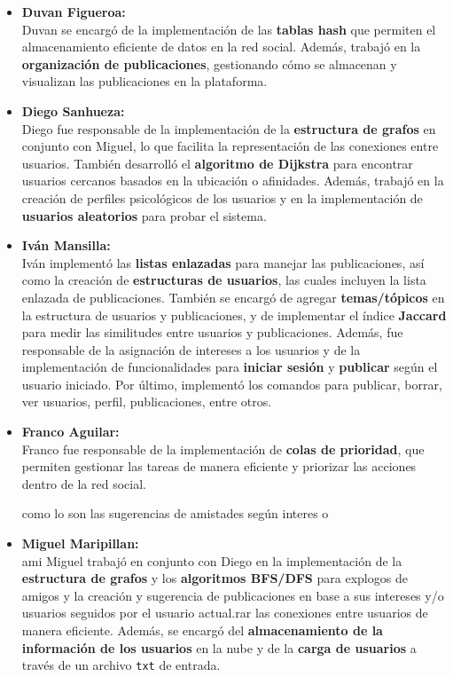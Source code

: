 \documentclass[9pt,letterpaper,onecolumn]{rho-class/rho}
\begin{document}
\begin{itemize}
	\item \textbf{Duvan Figueroa:} \\
	Duvan se encargó de la implementación de las \textbf{tablas hash} que permiten el almacenamiento eficiente de datos en la red social. Además, trabajó en la \textbf{organización de publicaciones}, gestionando cómo se almacenan y visualizan las publicaciones en la plataforma.
	
	\item \textbf{Diego Sanhueza:} \\
	Diego fue responsable de la implementación de la \textbf{estructura de grafos} en conjunto con Miguel, lo que facilita la representación de las conexiones entre usuarios. También desarrolló el \textbf{algoritmo de Dijkstra} para encontrar usuarios cercanos basados en la ubicación o afinidades. Además, trabajó en la creación de perfiles psicológicos de los usuarios y en la implementación de \textbf{usuarios aleatorios} para probar el sistema.
	
	\item \textbf{Iván Mansilla:} \\
	Iván implementó las \textbf{listas enlazadas} para manejar las publicaciones, así como la creación de \textbf{estructuras de usuarios}, las cuales incluyen la lista enlazada de publicaciones. También se encargó de agregar \textbf{temas/tópicos} en la estructura de usuarios y publicaciones, y de implementar el índice \textbf{Jaccard} para medir las similitudes entre usuarios y publicaciones. Además, fue responsable de la asignación de intereses a los usuarios y de la implementación de funcionalidades para \textbf{iniciar sesión} y \textbf{publicar} según el usuario iniciado. Por último, implementó los comandos para publicar, borrar, ver usuarios, perfil, publicaciones, entre otros.
	
	\item \textbf{Franco Aguilar:} \\
	Franco fue responsable de la implementación de \textbf{colas de prioridad}, que permiten gestionar las tareas de manera eficiente y priorizar las acciones dentro de la red social.
	
 como lo son las sugerencias de amistades según interes o 	\item \textbf{Miguel Maripillan:} \\
ami	Miguel trabajó en conjunto con Diego en la implementación de la \textbf{estructura de grafos} y los \textbf{algoritmos BFS/DFS} para explogos de amigos y la creación y sugerencia de publicaciones en base a sus intereses y/o usuarios seguidos por el usuario actual.rar las conexiones entre usuarios de manera eficiente. Además, se encargó del \textbf{almacenamiento de la información de los usuarios} en la nube y de la \textbf{carga de usuarios} a través de un archivo \texttt{txt} de entrada.
\end{itemize}
\end{document}

